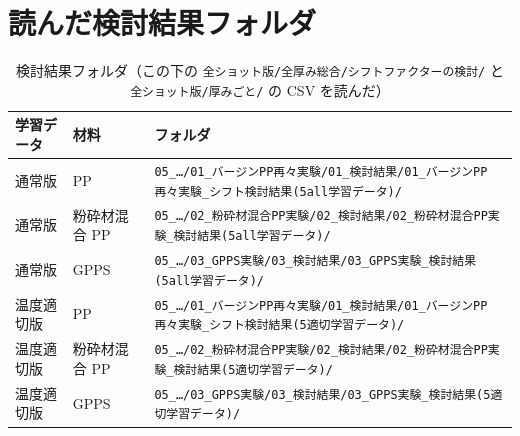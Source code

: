 \documentclass[paper=a4paper,landscape,fontsize=10pt,line_length=62zw,number_of_lines=34]{jlreq}
\begin{document}
\appendix
\section{読んだ検討結果フォルダ}
\begin{table}[H]\centering\footnotesize
\caption{検討結果フォルダ（この下の \texttt{全ショット版/\allowbreak{}全厚み総合/\allowbreak{}シフトファクターの検討/\allowbreak{}} と \texttt{全ショット版/\allowbreak{}厚みごと/\allowbreak{}} の CSV を読んだ）}\label{tab:files}
\begin{tabular}{lll}
\toprule
学習データ & 材料 & フォルダ \\
\midrule
通常版 & PP & \texttt{05\_\allowbreak{}…/\allowbreak{}01\_\allowbreak{}バージンPP再々実験/\allowbreak{}01\_\allowbreak{}検討結果/\allowbreak{}01\_\allowbreak{}バージンPP再々実験\_\allowbreak{}シフト検討結果(5all学習データ)/\allowbreak{}} \\
通常版 & 粉砕材混合 PP & \texttt{05\_\allowbreak{}…/\allowbreak{}02\_\allowbreak{}粉砕材混合PP実験/\allowbreak{}02\_\allowbreak{}検討結果/\allowbreak{}02\_\allowbreak{}粉砕材混合PP実験\_\allowbreak{}検討結果(5all学習データ)/\allowbreak{}} \\
通常版 & GPPS & \texttt{05\_\allowbreak{}…/\allowbreak{}03\_\allowbreak{}GPPS実験/\allowbreak{}03\_\allowbreak{}検討結果/\allowbreak{}03\_\allowbreak{}GPPS実験\_\allowbreak{}検討結果(5all学習データ)/\allowbreak{}} \\
温度適切版 & PP & \texttt{05\_\allowbreak{}…/\allowbreak{}01\_\allowbreak{}バージンPP再々実験/\allowbreak{}01\_\allowbreak{}検討結果/\allowbreak{}01\_\allowbreak{}バージンPP再々実験\_\allowbreak{}シフト検討結果(5適切学習データ)/\allowbreak{}} \\
温度適切版 & 粉砕材混合 PP & \texttt{05\_\allowbreak{}…/\allowbreak{}02\_\allowbreak{}粉砕材混合PP実験/\allowbreak{}02\_\allowbreak{}検討結果/\allowbreak{}02\_\allowbreak{}粉砕材混合PP実験\_\allowbreak{}検討結果(5適切学習データ)/\allowbreak{}} \\
温度適切版 & GPPS & \texttt{05\_\allowbreak{}…/\allowbreak{}03\_\allowbreak{}GPPS実験/\allowbreak{}03\_\allowbreak{}検討結果/\allowbreak{}03\_\allowbreak{}GPPS実験\_\allowbreak{}検討結果(5適切学習データ)/\allowbreak{}} \\
\bottomrule
\end{tabular}
\end{table}
\end{document}
